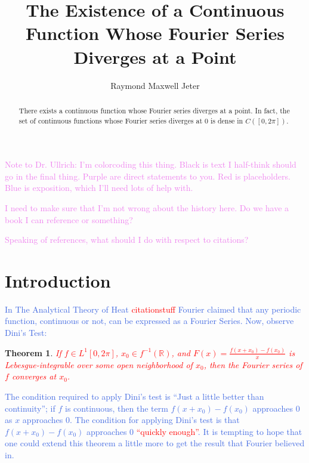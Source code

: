 \documentclass{amsart}
\newcommand{\R}{\mathbb{R}}
\newcommand{\colorcomment}[2]{\textcolor{#1}{#2}} %
\newtheorem{thm}{Theorem}[section]
\theoremstyle{definition}
\begin{document}
\title{The Existence of a Continuous Function Whose Fourier Series Diverges at a Point}
\author{Raymond Maxwell Jeter}

\begin{abstract}
There exists a continuous function whose Fourier series diverges at a point. 
In fact, the set of continuous functions whose Fourier series diverges at $0$ is dense in $C([0,2 \pi])$.
\end{abstract}

\maketitle

\colorcomment{Violet}{Note to Dr. Ullrich: I'm colorcoding this thing. Black is text I half-think should go in the final thing. Purple are direct statements to you. Red is placeholders. Blue is exposition, which I'll need lots of help with.}

\colorcomment{Violet}{I need to make sure that I'm not wrong about the history here. Do we have a book I can reference or something?}

\colorcomment{Violet}{Speaking of references, what should I do with respect to citations?}

\section{Introduction}


\colorcomment{RoyalBlue}{In The Analytical Theory of Heat \colorcomment{red}{citationstuff} Fourier claimed that any periodic function, continuous or not, can be expressed as a Fourier Series. 
Now, observe Dini's Test:}

\begin{thm}
\colorcomment{red}{If $f \in L^1[0, 2\pi]$, $x_0 \in f^{-1}(\R)$, and $F(x) = \frac{f(x+x_0) - f(x_0)}{x}$ is Lebesgue-integrable over some open neighborhood of $x_0$, then the Fourier series of $f$ converges at $x_0$.}
\end{thm}

\colorcomment{RoyalBlue}{The condition required to apply Dini's test is ``Just a little better than continuity''; if $f$ is continuous, then the term $f(x+x_0) - f(x_0)$ approaches $0$ as $x$ approaches $0$.
The condition for applying Dini's test is that $f(x+x_0) - f(x_0)$ approaches $0$ \colorcomment{red}{``quickly enough''}.
It is tempting to hope that one could extend this theorem a little more to get the result that Fourier believed in.}
\end{document}
